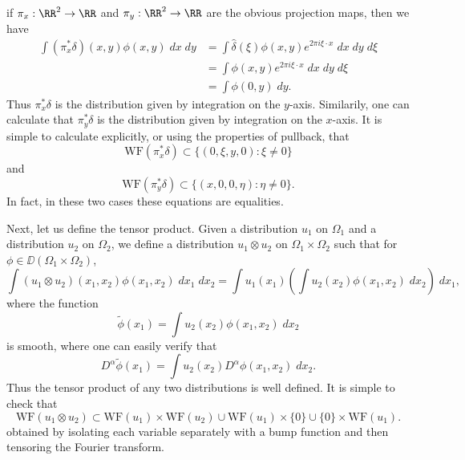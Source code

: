 \begin{example}
    if $\pi_x: \RR^2 \to \RR$ and $\pi_y: \RR^2 \to \RR$ are the obvious projection maps, then we have
    \begin{align*}
        \int (\pi_x^* \delta)(x,y) \phi(x,y)\; dx\; dy &= \int \widehat{\delta}(\xi) \phi(x,y) e^{2 \pi i \xi \cdot x}\; dx\; dy\; d\xi\\
        &= \int \phi(x,y) e^{2 \pi i \xi \cdot x}\; dx\; dy\; d\xi\\
        &= \int \phi(0,y)\; dy.
    \end{align*}
    Thus $\pi_x^* \delta$ is the distribution given by integration on the $y$-axis. Similarily, one can calculate that $\pi_y^* \delta$ is the distribution given by integration on the $x$-axis. It is simple to calculate explicitly, or using the properties of pullback, that
    \[ \text{WF}(\pi_x^* \delta) \subset \{ (0,\xi,y,0) : \xi \neq 0 \} \]
    and
    \[ \text{WF}(\pi_y^* \delta) \subset \{ (x,0,0,\eta): \eta \neq 0 \}. \]
    In fact, in these two cases these equations are equalities.
\end{example}

Next, let us define the tensor product. Given a distribution $u_1$ on $\Omega_1$ and a distribution $u_2$ on $\Omega_2$, we define a distribution $u_1 \otimes u_2$ on $\Omega_1 \times \Omega_2$ such that for $\phi \in \DD(\Omega_1 \times \Omega_2)$,
%
\[ \int (u_1 \otimes u_2)(x_1,x_2) \phi(x_1,x_2)\; dx_1\; dx_2 = \int u_1(x_1) \left( \int u_2(x_2) \phi(x_1,x_2)\; dx_2 \right)\; dx_1, \]
%
where the function
%
\[ \tilde{\phi}(x_1) = \int u_2(x_2) \phi(x_1,x_2)\; dx_2 \]
%
is smooth, where one can easily verify that
%
\[ D^\alpha \tilde{\phi}(x_1) = \int u_2(x_2) D^\alpha \phi(x_1,x_2)\; dx_2. \]
%
Thus the tensor product of any two distributions is well defined. It is simple to check that
%
\[ \text{WF}(u_1 \otimes u_2) \subset \text{WF}(u_1) \times \text{WF}(u_2) \cup \text{WF}(u_1) \times \{ 0 \} \cup \{ 0 \} \times \text{WF}(u_1). \]
%
obtained by isolating each variable separately with a bump function and then tensoring the Fourier transform.

